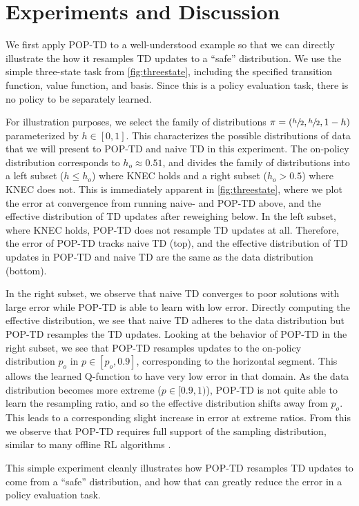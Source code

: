 \section{Experiments and Discussion}

We first apply POP-TD to a well-understood example so that we can directly illustrate the how it resamples TD updates to a ``safe'' distribution. We use the simple three-state task from \cref{fig:threestate}, including the specified transition function, value function, and basis. Since this is a policy evaluation task, there is no policy to be separately learned.

For illustration purposes, we select the family of distributions $\pi = (\sfrac h 2, \sfrac h 2, 1- h)$ parameterized by $h \in [0, 1]$.
This characterizes the possible distributions of data that we will present to POP-TD and naive TD in this experiment. The on-policy distribution corresponds to $h_o\approx 0.51$, and divides the family of distributions into a left subset ($h \leq h_o$) where KNEC holds and a right subset ($h_o > 0.5$) where KNEC does not. This is immediately apparent in \cref{fig:threestate}, where we plot the error at convergence from running naive- and POP-TD above, and the effective distribution of TD updates after reweighing below.
In the left subset, where KNEC holds, POP-TD does not resample TD updates at all. Therefore, the error of POP-TD tracks naive TD (top), and the effective distribution of TD updates in POP-TD and naive TD are the same as the data distribution (bottom).

In the right subset, we observe that naive TD converges to poor solutions with large error while POP-TD is able to learn with low error.
Directly computing the effective distribution, we see that naive TD adheres to the data distribution but POP-TD resamples the TD updates.
Looking at the behavior of POP-TD in the right subset, we see that POP-TD resamples updates to the on-policy distribution $p_o$ in $p\in[p_o,0.9]$, corresponding to the horizontal segment. This allows the learned Q-function to have very low error in that domain. As the data distribution becomes more extreme ($p\in [0.9, 1)$), POP-TD is not quite able to learn the resampling ratio, and so the effective distribution shifts away from $p_o$. This leads to a corresponding slight increase in error at extreme ratios. From this we observe that POP-TD requires full support of the sampling distribution, similar to many offline RL algorithms \cite{kumar2020cql,shi2022pessimistic}.

This simple experiment cleanly illustrates how POP-TD resamples TD updates to come from a ``safe'' distribution, and how that can greatly reduce the error in a policy evaluation task.

